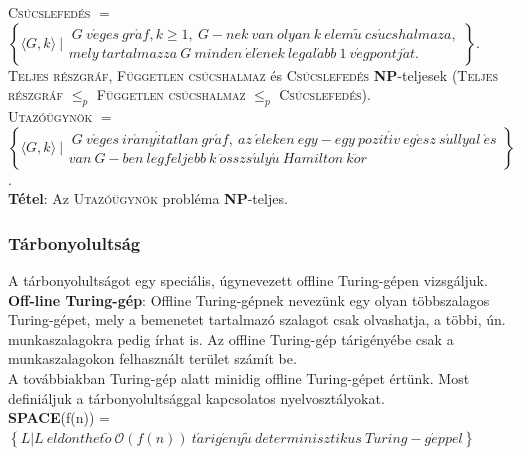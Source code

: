 \documentclass[margin=0px]{article}
\begin{document}
	\noindent \textsc{Csúcslefedés} $=$\\
	$\left\{\langle G, k \rangle \ | \begin{array}{lr}
	\ G \ v\acute{e}ges \ gr\acute{a}f, k \geq 1, \ G-nek \ van \ olyan \ k	\ elem\tilde{u} \ cs\acute{u}cshalmaza,\\
	mely \ tartalmazza \ G \ minden \ \acute{e}l\acute{e}nek \ legal\acute{a}bb \ 1 \ v\acute{e}gpontj\acute{a}t.
	\end{array}
	\right\}$.\\
	
	
	\noindent \textsc{Teljes részgráf}, \textsc{Független csúcshalmaz} és \textsc{Csúcslefedés} \textbf{NP}-teljesek
	(\textsc{Teljes részgráf} $\leq_{p}$ \textsc{Független csúcshalmaz} $\leq_{p}$ \textsc{Csúcslefedés}).\\
	
	\noindent \textsc{Utazóügynök} $=$\\
	$\left\{\langle G, k \rangle \ |
	\begin{array}{lr}
	 \ G \ v\acute{e}ges \ ir\acute{a}ny\acute{i}tatlan \ gr\acute{a}f, \ az \ \acute{e}leken \ egy-egy \
	pozit\acute{i}v \ eg\acute{e}sz \ s\acute{u}llyal \ \acute{e}s \\
	van \ G-ben \ legfeljebb \ k \ \ddot{o}sszs\acute{u}ly\acute{u} \ Hamilton \ k\ddot{o}r
	\end{array}
	 \right\}$.\\	
	 
	\noindent \textbf{Tétel}: Az \textsc{Utazóügynök} probléma \textbf{NP}-teljes.
	
	\subsubsection{Tárbonyolultság}
	A tárbonyolultságot egy speciális, úgynevezett offline Turing-gépen vizsgáljuk.\\
	
	\noindent \textbf{Off-line Turing-gép}: Offline Turing-gépnek nevezünk egy olyan többszalagos Turing-gépet,
	mely a bemenetet tartalmazó szalagot csak olvashatja, a többi, ún. munkaszalagokra
	pedig írhat is. Az offline Turing-gép tárigényébe csak a munkaszalagokon
	felhasznált terület számít be.\\
	
	A továbbiakban Turing-gép alatt minidig offline Turing-gépet értünk. Most
	definiáljuk a tárbonyolultsággal kapcsolatos nyelvosztályokat.\\
	
	\noindent \textbf{SPACE}(f(n)) = $\left\{L|L \ eld\ddot{o}nthet\tilde{o} \ \mathcal{O}(f(n)) \ t\acute{a}rig\acute{e}ny\tilde{u} \
	determinisztikus \ Turing-g\acute{e}ppel \right\}$\\
	
\end{document}
